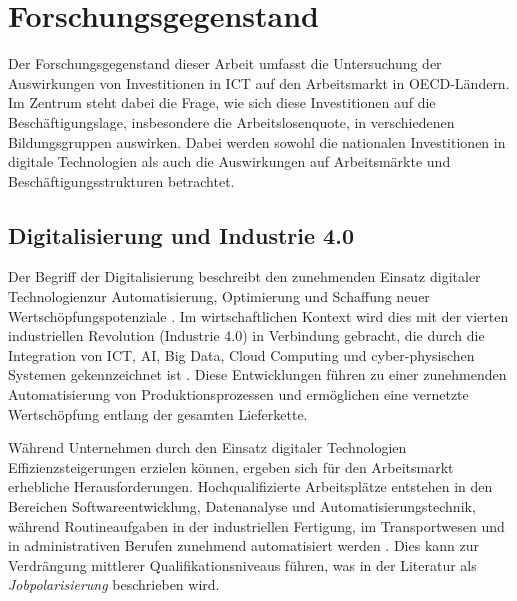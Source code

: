 
\section{Forschungsgegenstand}

Der Forschungsgegenstand dieser Arbeit umfasst die Untersuchung der Auswirkungen von 
Investitionen in \ac{ICT} auf den Arbeitsmarkt in \ac{OECD}-Ländern. Im Zentrum steht 
dabei die Frage, wie sich diese Investitionen auf die Beschäftigungslage, insbesondere 
die Arbeitslosenquote, in verschiedenen Bildungsgruppen auswirken. Dabei werden sowohl 
die nationalen Investitionen in digitale Technologien als auch die Auswirkungen auf 
Arbeitsmärkte und Beschäftigungsstrukturen betrachtet.


\subsection{Digitalisierung und Industrie 4.0}

Der Begriff der Digitalisierung beschreibt den zunehmenden Einsatz digitaler 
Technologienzur Automatisierung, Optimierung und Schaffung neuer Wertschöpfungspotenziale
\parencite[vgl.][S. 6]{brennen2016theinternational}. Im wirtschaftlichen Kontext wird 
dies mit der vierten industriellen Revolution (Industrie 4.0) in Verbindung gebracht, 
die durch die Integration von \ac{ICT}, \ac{AI}, Big Data, Cloud Computing und 
cyber-physischen Systemen gekennzeichnet ist 
\parencite[vgl.][S. 13–14]{kagermann2013recommendations}. Diese Entwicklungen führen zu 
einer zunehmenden Automatisierung von Produktionsprozessen und ermöglichen eine 
vernetzte Wertschöpfung entlang der gesamten Lieferkette.

Während Unternehmen durch den Einsatz digitaler Technologien Effizienzsteigerungen 
erzielen können, ergeben sich für den Arbeitsmarkt erhebliche Herausforderungen. 
Hochqualifizierte Arbeitsplätze entstehen in den Bereichen Softwareentwicklung, 
Datenanalyse und Automatisierungstechnik, während Routineaufgaben in der industriellen 
Fertigung, im Transportwesen und in administrativen Berufen zunehmend automatisiert 
werden \parencite[vgl.][S. 36–37]{frey2013thefuture}. Dies kann zur Verdrängung mittlerer
Qualifikationsniveaus führen, was in der Literatur als \textit{Jobpolarisierung} 
beschrieben wird.

